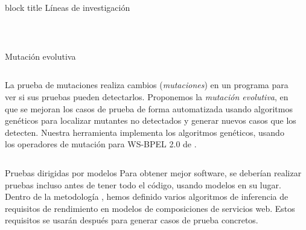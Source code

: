 \documentclass[usepdftitle=false,xcolor={svgnames}]{beamer}
\newcommand*{\herramienta}[1]{\textbf{\structure{#1}}}
\begin{document}
\begin{frame}{}
  \begin{center}
    ~
    \begin{beamercolorbox}[ht=4ex,wd=.975\textwidth,center,colsep=.75ex,rounded=true]{block title}%
      \large Líneas de investigación
    \end{beamercolorbox}
    ~
  \end{center}

  \vspace{-1em}

    \begin{columns}[T]
      \begin{column}{.45\textwidth}
        \begin{block}{Mutación evolutiva}
          \begin{columns}
             \small La prueba de mutaciones
            realiza cambios (\emph{mutaciones}) en un programa para
            ver si sus pruebas pueden detectarlos. Proponemos la
            \emph{mutación evolutiva}, en que se mejoran los casos de
            prueba de forma automatizada usando algoritmos genéticos
            para localizar mutantes no detectados y generar nuevos
            casos que los detecten. Nuestra herramienta
            \href{http://neptuno.uca.es/~gamera}{\herramienta{GAmera}}
            implementa los algoritmos genéticos, usando los operadores
            de mutación para WS-BPEL 2.0 de
            \href{https://neptuno.uca.es/redmine/projects/sources-fm/}{\herramienta{MuBPEL}}.

            \begin{center}
              \scriptsize \def\svgwidth{\textwidth}
              
            \end{center}
          \end{columns}
        \end{block}

      \begin{block}{Pruebas dirigidas por modelos}
        \small Para obtener mejor software, se deberían realizar
        pruebas incluso antes de tener todo el código, usando modelos
        en su lugar. Dentro de la metodología
        \href{https://neptuno.uca.es/redmine/projects/sodmt/}{\herramienta{SODM+T}},
        hemos definido varios algoritmos de inferencia de requisitos
        de rendimiento en modelos de composiciones de servicios
        web. Estos requisitos se usarán después para generar casos de
        prueba concretos.


\end{block}
\end{column}
\end{columns}
\end{frame}
\end{document}
